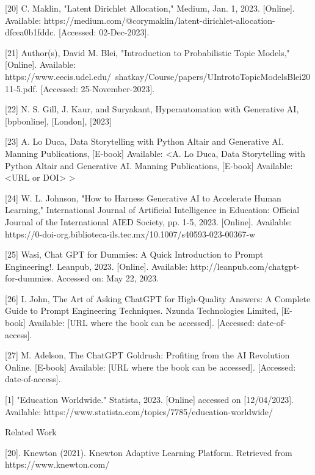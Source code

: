 [20] C. Maklin, "Latent Dirichlet Allocation," Medium, Jan. 1, 2023. [Online]. Available: https://medium.com/@corymaklin/latent-dirichlet-allocation-dfcea0b1fddc. [Accessed: 02-Dec-2023].


[21]  Author(s), David M. Blei, "Introduction to Probabilistic Topic Models,"  [Online]. Available: https://www.eecis.udel.edu/~shatkay/Course/papers/UIntrotoTopicModelsBlei2011-5.pdf. [Accessed: 25-November-2023].



[22] N. S. Gill, J. Kaur, and Suryakant, Hyperautomation with Generative AI, [bpbonline], [London], [2023]

[23]  A. Lo Duca, Data Storytelling with Python Altair and Generative AI. Manning Publications, [E-book] Available: <A. Lo Duca, Data Storytelling with Python Altair and Generative AI. Manning Publications, [E-book] Available: <URL or DOI>
>


[24] W. L. Johnson, "How to Harness Generative AI to Accelerate Human Learning," International Journal of Artificial Intelligence in Education: Official Journal of the International AIED Society, pp. 1-5, 2023. [Online]. Available: https://0-doi-org.biblioteca-ils.tec.mx/10.1007/s40593-023-00367-w







[25]  Wasi, Chat GPT for Dummies: A Quick Introduction to Prompt Engineering!. Leanpub, 2023. [Online]. Available: http://leanpub.com/chatgpt-for-dummies. Accessed on: May 22, 2023.


[26] I. John, The Art of Asking ChatGPT for High-Quality Answers: A Complete Guide to Prompt Engineering Techniques. Nzunda Technologies Limited, [E-book] Available: [URL where the book can be accessed]. [Accessed: date-of-access].




[27] M. Adelson, The ChatGPT Goldrush: Profiting from the AI Revolution Online. [E-book] Available: [URL where the book can be accessed]. [Accessed: date-of-access].





[1] "Education Worldwide." Statista, 2023. [Online]  accessed on [12/04/2023]. Available: https://www.statista.com/topics/7785/education-worldwide/


Related Work 









[20]. Knewton (2021). Knewton Adaptive Learning Platform. Retrieved from https://www.knewton.com/ 





